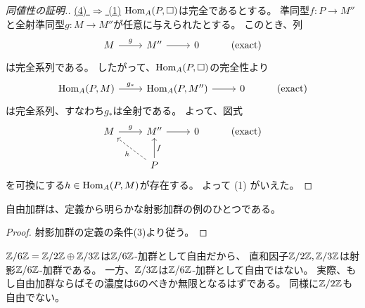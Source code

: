 \documentclass[report]{jlreq}
\begin{document}
\begin{proof}[同値性の証明.]
    \uline{(4) $\Rightarrow$ (1)} \quad
    $\operatorname{Hom}_A(P, \Box)$は完全であるとする。
    準同型$f \colon P \to M''$と全射準同型$g \colon M \to M''$が任意に与えられたとする。
    このとき、列
    \begin{equation}
        \begin{tikzcd}
            M \ar{r}{g}
                & M'' \ar{r}
                & 0
                & (\text{exact})
        \end{tikzcd}
    \end{equation}
    は完全系列である。
    したがって、$\operatorname{Hom}_A(P, \Box)$の完全性より
    \begin{equation}
        \begin{tikzcd}
            \Hom_A(P, M) \ar{r}{g_*}
                & \Hom_A(P, M'') \ar{r}
                & 0
                & (\text{exact})
        \end{tikzcd}
    \end{equation}
    は完全系列、すなわち$g_*$は全射である。
    よって、図式
    \begin{equation}
        \begin{tikzcd}
            M \ar{r}{g}
                & M'' \ar{r}
                & 0
                & (\text{exact}) \\
            & P \ar[dashed]{lu}{h} \ar{u}[swap]{f}
        \end{tikzcd}
    \end{equation}
    を可換にする$h \in \operatorname{Hom}_A(P, M)$が存在する。
    よって (1) がいえた。

\end{proof}

自由加群は、定義から明らかな射影加群の例のひとつである。


\begin{proof}
    射影加群の定義の条件(3)より従う。
\end{proof}

\begin{example}[自由でない射影加群の例]
    $\mathbb{Z}/6\mathbb{Z} = \mathbb{Z}/2\mathbb{Z} \oplus \mathbb{Z}/3\mathbb{Z}$は$\mathbb{Z}/6\mathbb{Z}$-加群として自由だから、
    直和因子$\mathbb{Z}/2\mathbb{Z}, \mathbb{Z}/3\mathbb{Z}$は射影$\mathbb{Z}/6\mathbb{Z}$-加群である。
    一方、$\mathbb{Z}/3\mathbb{Z}$は$\mathbb{Z}/6\mathbb{Z}$-加群として自由ではない。
    実際、もし自由加群ならばその濃度は$6$のべきか無限となるはずである。
    同様に$\mathbb{Z}/2\mathbb{Z}$も自由でない。
\end{example}
\end{document}
